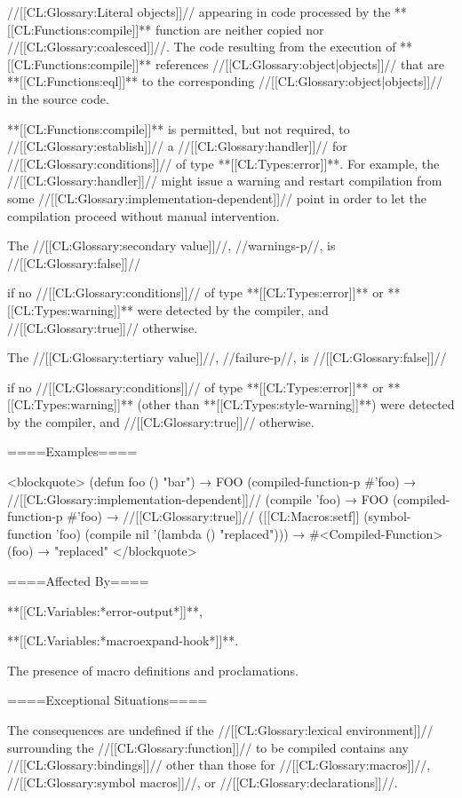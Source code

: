 //[[CL:Glossary:Literal objects]]// appearing in code processed by the **[[CL:Functions:compile]]** function are neither copied nor //[[CL:Glossary:coalesced]]//. The code resulting from the execution of **[[CL:Functions:compile]]** references //[[CL:Glossary:object|objects]]// that are **[[CL:Functions:eql]]** to the corresponding //[[CL:Glossary:object|objects]]// in the source code.

**[[CL:Functions:compile]]** is permitted, but not required, to //[[CL:Glossary:establish]]// a //[[CL:Glossary:handler]]// for //[[CL:Glossary:conditions]]// of type **[[CL:Types:error]]**. For example, the //[[CL:Glossary:handler]]// might issue a warning and restart compilation from some //[[CL:Glossary:implementation-dependent]]// point in order to let the compilation proceed without manual intervention.

The //[[CL:Glossary:secondary value]]//, //warnings-p//, is //[[CL:Glossary:false]]//

if no //[[CL:Glossary:conditions]]// of type **[[CL:Types:error]]** or **[[CL:Types:warning]]** were detected by the compiler, and //[[CL:Glossary:true]]// otherwise.

The //[[CL:Glossary:tertiary value]]//, //failure-p//, is //[[CL:Glossary:false]]//

if no //[[CL:Glossary:conditions]]// of type **[[CL:Types:error]]** or **[[CL:Types:warning]]** (other than **[[CL:Types:style-warning]]**) were detected by the compiler, and //[[CL:Glossary:true]]// otherwise.

====Examples====

<blockquote> (defun foo () "bar") → FOO (compiled-function-p #'foo) → //[[CL:Glossary:implementation-dependent]]// (compile 'foo) → FOO (compiled-function-p #'foo) → //[[CL:Glossary:true]]// ([[CL:Macros:setf]] (symbol-function 'foo) (compile nil '(lambda () "replaced"))) → #<Compiled-Function> (foo) → "replaced" </blockquote>

====Affected By====

**[[CL:Variables:*error-output*]]**,

**[[CL:Variables:*macroexpand-hook*]]**.

The presence of macro definitions and proclamations.

====Exceptional Situations====

The consequences are undefined if the //[[CL:Glossary:lexical environment]]// surrounding the //[[CL:Glossary:function]]// to be compiled contains any //[[CL:Glossary:bindings]]// other than those for //[[CL:Glossary:macros]]//, //[[CL:Glossary:symbol macros]]//, or //[[CL:Glossary:declarations]]//.

